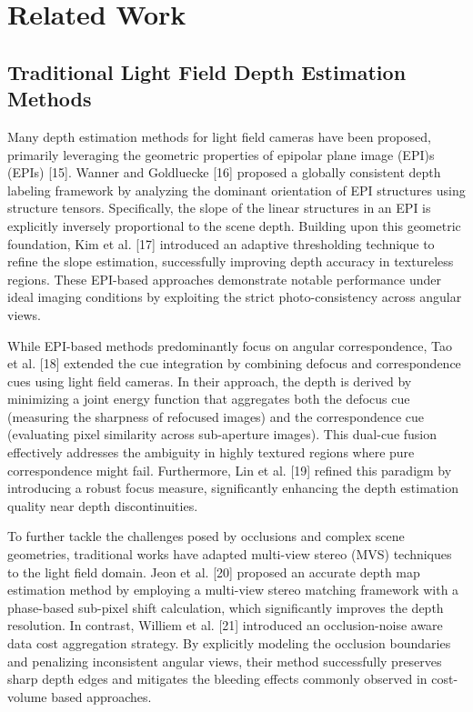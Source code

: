 \section{Related Work}

\subsection{Traditional Light Field Depth Estimation Methods}

Many depth estimation methods for light field cameras have been proposed, primarily leveraging the geometric properties of epipolar plane image (EPI)s (EPIs) [15]. Wanner and Goldluecke [16] proposed a globally consistent depth labeling framework by analyzing the dominant orientation of EPI structures using structure tensors. Specifically, the slope of the linear structures in an EPI is explicitly inversely proportional to the scene depth. Building upon this geometric foundation, Kim et al. [17] introduced an adaptive thresholding technique to refine the slope estimation, successfully improving depth accuracy in textureless regions. These EPI-based approaches demonstrate notable performance under ideal imaging conditions by exploiting the strict photo-consistency across angular views.

While EPI-based methods predominantly focus on angular correspondence, Tao et al. [18] extended the cue integration by combining defocus and correspondence cues using light field cameras. In their approach, the depth is derived by minimizing a joint energy function that aggregates both the defocus cue (measuring the sharpness of refocused images) and the correspondence cue (evaluating pixel similarity across sub-aperture images). This dual-cue fusion effectively addresses the ambiguity in highly textured regions where pure correspondence might fail. Furthermore, Lin et al. [19] refined this paradigm by introducing a robust focus measure, significantly enhancing the depth estimation quality near depth discontinuities.

To further tackle the challenges posed by occlusions and complex scene geometries, traditional works have adapted multi-view stereo (MVS) techniques to the light field domain. Jeon et al. [20] proposed an accurate depth map estimation method by employing a multi-view stereo matching framework with a phase-based sub-pixel shift calculation, which significantly improves the depth resolution. In contrast, Williem et al. [21] introduced an occlusion-noise aware data cost aggregation strategy. By explicitly modeling the occlusion boundaries and penalizing inconsistent angular views, their method successfully preserves sharp depth edges and mitigates the bleeding effects commonly observed in cost-volume based approaches.

